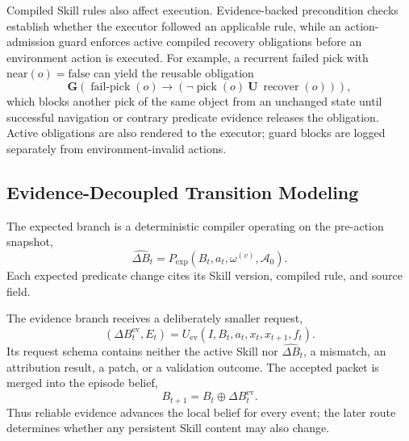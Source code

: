 {\color{red}Compiled Skill rules also affect execution. Evidence-backed precondition checks establish whether the executor followed an applicable rule, while an action-admission guard enforces active compiled recovery obligations before an environment action is executed. For example, a recurrent failed pick with $\mathrm{near}(o)=\mathrm{false}$ can yield the reusable obligation
\begin{equation}
    \mathbf{G}\!\left(
    \operatorname{fail\mbox{-}pick}(o)\rightarrow
    \left(\neg\operatorname{pick}(o)\ \mathbf{U}\
    \operatorname{recover}(o)\right)
    \right),
\end{equation}
which blocks another pick of the same object from an unchanged state until successful navigation or contrary predicate evidence releases the obligation. Active obligations are also rendered to the executor; guard blocks are logged separately from environment-invalid actions.}

\subsection{Evidence-Decoupled Transition Modeling}

The expected branch is a deterministic compiler operating on the pre-action snapshot,
\begin{equation}
    \widehat{\Delta B}_t=
    P_{\mathrm{exp}}\left(B_t,a_t,\omega^{(v)},\mathcal{A}_0\right).
\end{equation}
 Each expected predicate change cites its Skill version, compiled rule, and source field. 

The evidence branch receives a deliberately smaller request,
\begin{equation}
    \left(\Delta B_t^{\mathrm{ev}},E_t\right)=
    U_{\mathrm{ev}}\left(I,B_t,a_t,x_t,x_{t+1},f_t\right).
\end{equation}
Its request schema contains neither the active Skill nor $\widehat{\Delta B}_t$, a mismatch, an attribution result, a patch, or a validation outcome.  The accepted packet is merged into the episode belief,
\begin{equation}
    B_{t+1}=B_t\oplus\Delta B_t^{\mathrm{ev}}.
\end{equation}
Thus reliable evidence advances the local belief for every event; the later route determines whether any persistent Skill content may also change.

